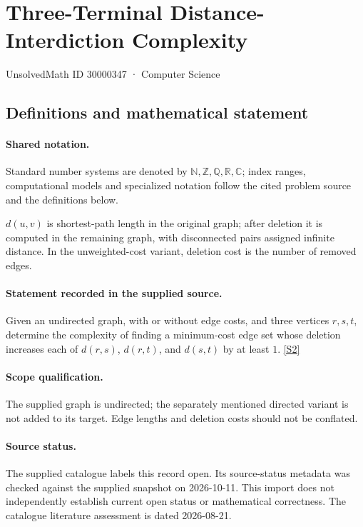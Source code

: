 \documentclass[11pt]{article}
\newcommand{\sref}[2]{\hyperlink{source:#1:#2}{[S#2]}}
\begin{document}
\setcounter{section}{30000346}
\section{Three-Terminal Distance-Interdiction Complexity}\label{30000347}
{\small\sffamily UnsolvedMath ID 30000347 · Computer Science}
\subsection{Definitions and mathematical statement}

\paragraph{Shared notation.}Standard number systems are denoted by $\mathbb N,\mathbb Z,\mathbb Q,\mathbb R,\mathbb C$; index ranges, computational models and specialized notation follow the cited problem source and the definitions below.


$d(u,v)$ is shortest-path length in the original graph; after deletion it is computed in the remaining graph, with disconnected pairs assigned infinite distance. In the unweighted-cost variant, deletion cost is the number of removed edges.
\paragraph{Statement recorded in the supplied source.}
Given an undirected graph, with or without edge costs, and three vertices $r,s,t$, determine the complexity of finding a minimum-cost edge set whose deletion increases each of $d(r,s)$, $d(r,t)$, and $d(s,t)$ by at least $1$. \sref{30000347}{2}
\paragraph{Scope qualification.}
The supplied graph is undirected; the separately mentioned directed variant is not added to its target. Edge lengths and deletion costs should not be conflated.
\paragraph{Source status.}
The supplied catalogue labels this record open. Its source-status metadata was checked against the supplied snapshot on 2026-10-11. This import does not independently establish current open status or mathematical correctness. The catalogue literature assessment is dated 2026-08-21.
\end{document}
